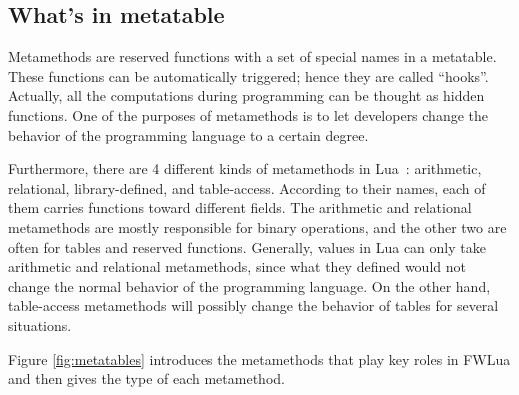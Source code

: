 \subsection{What's in metatable}
Metamethods are reserved functions with a set of special names in a metatable. These functions can be automatically triggered; hence they are called ``hooks''. Actually, all the computations during programming can be thought as hidden functions. One of the purposes of metamethods is to let developers change the behavior of the programming language to a certain degree.

Furthermore, there are 4 different kinds of metamethods in Lua~\cite{PIL}: arithmetic, relational, library-defined, and table-access. According to their names, each of them carries functions toward different fields. The arithmetic and relational metamethods are mostly responsible for binary operations, and the other two are often for tables and reserved functions. Generally, values in Lua can only take arithmetic and relational metamethods, since what they defined would not change the normal behavior of the programming language. On the other hand, table-access metamethods will possibly change the behavior of tables for several situations.

Figure \ref{fig:metatables} introduces the metamethods that play key roles in FWLua and then gives the type of each metamethod.


